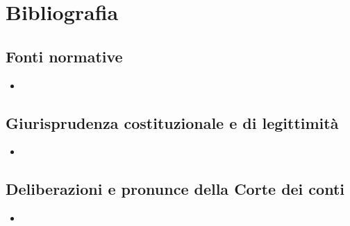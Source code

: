 %
%
%

\chapter*{Bibliografia}

\section*{Fonti normative}
\begin{itemize}\setlength{\itemsep}{0.2em}
  \item %
\end{itemize}

\section*{Giurisprudenza costituzionale e di legittimità}
\begin{itemize}\setlength{\itemsep}{0.2em}
  \item %
\end{itemize}

\section*{Deliberazioni e pronunce della Corte dei conti}
\begin{itemize}\setlength{\itemsep}{0.2em}
  \item %
\end{itemize}

